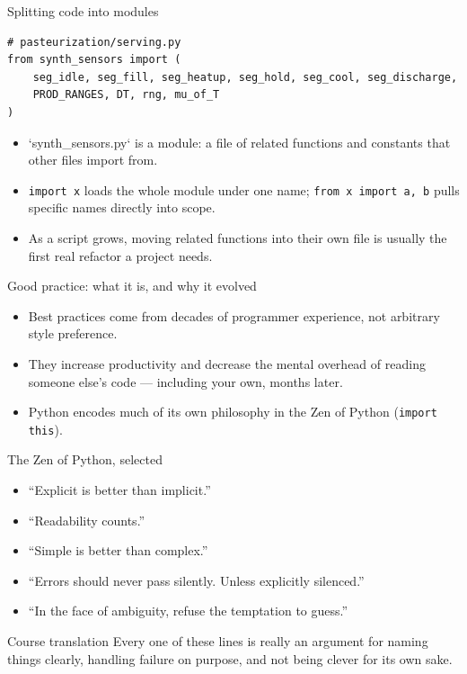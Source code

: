 \begin{frame}[fragile]{Splitting code into modules}
\begin{lstlisting}[style=coursepython]
# pasteurization/serving.py
from synth_sensors import (
    seg_idle, seg_fill, seg_heatup, seg_hold, seg_cool, seg_discharge,
    PROD_RANGES, DT, rng, mu_of_T
)
\end{lstlisting}
\begin{itemize}
\item `synth\_sensors.py` is a module: a file of related functions and constants that other files import from.
\item \texttt{import x} loads the whole module under one name; \texttt{from x import a, b} pulls specific names directly into scope.
\item As a script grows, moving related functions into their own file is usually the first real refactor a project needs.
\end{itemize}
\coursefooter
\end{frame}

\begin{frame}{Good practice: what it is, and why it evolved}
\begin{itemize}
\item Best practices come from decades of programmer experience, not arbitrary style preference.
\item They increase productivity and decrease the mental overhead of reading someone else's code --- including your own, months later.
\item Python encodes much of its own philosophy in the Zen of Python (\texttt{import this}).
\end{itemize}
\coursefooter
\end{frame}

\begin{frame}{The Zen of Python, selected}
\begin{itemize}
\item ``Explicit is better than implicit.''
\item ``Readability counts.''
\item ``Simple is better than complex.''
\item ``Errors should never pass silently. Unless explicitly silenced.''
\item ``In the face of ambiguity, refuse the temptation to guess.''
\end{itemize}
\begin{block}{Course translation}
Every one of these lines is really an argument for naming things clearly, handling failure on purpose, and not being clever for its own sake.
\end{block}
\coursefooter
\end{frame}

